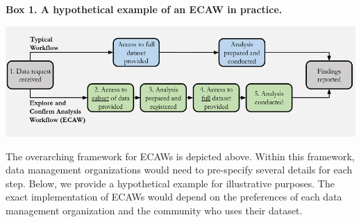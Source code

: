 \documentclass[
  man,floatsintext]{apa6}
\begin{document}
\begin{tcolorbox}
\textbf{Box 1. A hypothetical example of an ECAW in practice.}

\includegraphics[width=1\textwidth]{./ecaw_workflow.png}
{\fontsize{10pt}{10pt}\selectfont
The overarching framework for ECAWs is depicted above. Within this framework, data management organizations would need to pre-specify several details for each step. Below, we provide a hypothetical example for illustrative purposes. The exact implementation of ECAWs would depend on the preferences of each data management organization and the community who uses their dataset.

}
\end{tcolorbox}
\end{document}
